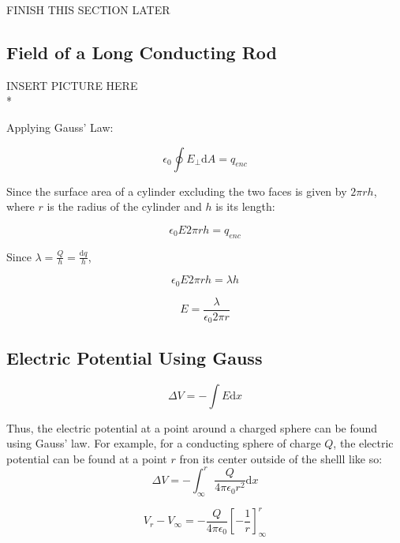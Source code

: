 \documentclass[a4paper,12pt]{article}
\begin{document}
				    FINISH THIS SECTION LATER	

				\subsection{Field of a Long Conducting Rod}
					INSERT PICTURE HERE\\*

					Applying Gauss' Law:
					
					\begin{equation*}
							\epsilon_{0} \oint E_{\bot} \mathrm{d}A = q_{enc}
					\end{equation*}

					Since the surface area of a cylinder excluding the two faces is given by $2\pi r h$, where $r$ is the radius of the cylinder and $h$ is its length:

					\begin{equation*}
							\epsilon_{0} E 2 \pi r h = q_{enc}
					\end{equation*}

					Since $\lambda = \frac{Q}{h} = \frac{\mathrm{d}q}{h}$,

					\begin{equation*}
							\epsilon_{0} E 2 \pi r h = \lambda h 
					\end{equation*}

					\begin{equation*}
							E = \frac{\lambda}{\epsilon_{0} 2 \pi r}
					\end{equation*}
				
				\subsection{Electric Potential Using Gauss}
					\begin{equation*}
							\Delta V = -\int E \mathrm{d}x 
					\end{equation*}

						Thus, the electric potential at a point around a charged sphere can be found using Gauss' law. For example, for a conducting sphere of charge $Q$, the electric potential can be found at a point  $r$ fron its center outside of the shelll like so:							
						\begin{equation*}
								\Delta V =-\int_{\infty}^{r} \frac{Q}{4 \pi \epsilon_{0} r^{2}} \mathrm{d}x
						\end{equation*}

						\begin{equation*}
								V_{r} - V_{\infty} = -\frac{Q}{4 \pi \epsilon_{0}}\left[-\frac{1}{r}\right]_{\infty}^{r}
						\end{equation*}
\end{document}
